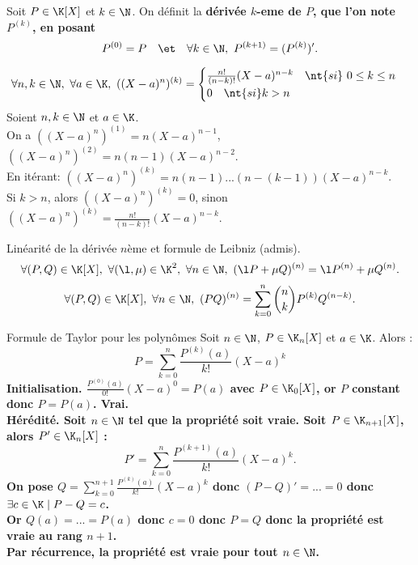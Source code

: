 \documentclass[11pt]{article}
\begin{document}
\begin{defi}{}{}
    Soit $P\in\K[X]$ et $k\in\N$. On définit la \bf{dérivée $k$-eme} de $P$, que l'on note $P^{(k)}$, en posant
    \begin{equation*}
        P^{(0)}=P \quad \et \quad \forall k \in \N, ~ P^{(k+1)}=(P^{(k)})'.
    \end{equation*}
\end{defi}

\begin{ex}{}{}
    \begin{equation*}
        \forall n,k \in \N, ~ \forall a \in \K, ~ ((X-a)^n)^{(k)} = \begin{cases}\frac{n!}{(n-k)!}(X-a)^{n-k} \quad \nt{si} ~ 0 \leq k \leq n\\ 0 \quad \nt{si } k > n\end{cases}
    \end{equation*}
    \tcblower
    Soient $n,k\in\N$ et $a\in\K$.\\
    On a $((X-a)^n)^{(1)}=n(X-a)^{n-1}$, $((X-a)^n)^{(2)}=n(n-1)(X-a)^{n-2}$.\\
    En itérant: $((X-a)^n)^{(k)}=n(n-1)...(n-(k-1))(X-a)^{n-k}$.\\
    Si $k>n$, alors $((X-a)^n)^{(k)}=0$, sinon $((X-a)^n)^{(k)}=\frac{n!}{(n-k)!}(X-a)^{n-k}$.
\end{ex}

\begin{prop}{Linéarité de la dérivée $n$ème et formule de Leibniz (admis).}{}
    \begin{equation*}
        \forall (P,Q)\in\K[X], ~ \forall (\l,\mu)\in\K^2, ~ \forall n \in \N, ~ (\l P + \mu Q)^{(n)} = \l P^{(n)} + \mu Q^{(n)}.
    \end{equation*}
    \begin{equation*}
        \forall (P,Q)\in\K[X], ~ \forall n \in \N, ~ (PQ)^{(n)} = \sum_{k=0}^n\binom{n}{k}P^{(k)}Q^{(n-k)}.
    \end{equation*}
\end{prop}

\begin{prop}{Formule de Taylor pour les polynômes}{}
    Soit $n\in\N$, $P\in\K_n[X]$ et $a\in\K$. Alors :
    \begin{equation*}
        P=\sum_{k=0}^n\frac{P^{(k)}(a)}{k!}(X-a)^k
    \end{equation*}
    \tcblower
    \bf{Initialisation.} $\frac{P^{(0)}(a)}{0!}(X-a)^0=P(a)$ avec $P\in\K_0[X]$, or $P$ constant donc $P=P(a)$. Vrai.\\
    \bf{Hérédité.} Soit $n\in\N$ tel que la propriété soit vraie. Soit $P\in\K_{n+1}[X]$, alors $P'\in\K_n[X]$ :
    \begin{equation*}
        P'=\sum_{k=0}^n\frac{P^{(k+1)}(a)}{k!}(X-a)^k.
    \end{equation*}
    On pose $Q=\sum_{k=0}^{n+1}\frac{P^{(k)}(a)}{k!}(X-a)^k$ donc $(P-Q)'=...=0$ donc $\exists c\in\K\mid P-Q=c$.\\
    Or $Q(a)=...=P(a)$ donc $c=0$ donc $P=Q$ donc la propriété est vraie au rang $n+1$.\\
    Par récurrence, la propriété est vraie pour tout $n\in\N$.
\end{prop}
\end{document}
